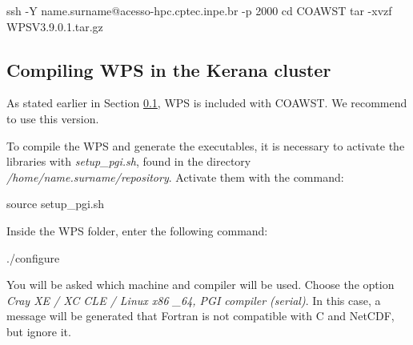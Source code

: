 \begin{bashcode}
ssh -Y name.surname@acesso-hpc.cptec.inpe.br -p 2000
cd COAWST
tar -xvzf WPSV3.9.0.1.tar.gz
\end{bashcode}
\bigskip

\subsection{Compiling WPS in the Kerana cluster}\label{wpsker}
\bigskip

\begin{tcolorbox}[enhanced,
    grow to left by=0cm,%
    grow to right by=0cm,%
    enlarge top by=0cm,%
    enlarge bottom by=0cm,%
    tcbox raise base,
    boxrule=1.0pt,
    left=18mm,
    colframe=red!50!black,coltext=red!25!black,colback=red!10!white,
    overlay={\begin{tcbclipinterior}\fill[red!75!blue!50!white] (frame.south west)
      rectangle node[text=white,font=\sffamily\bfseries\footnotesize,rotate=0] {WARNING} ([xshift=18mm]frame.north west);\end{tcbclipinterior}}]
      As stated earlier in Section \textcolor{bleu_cite}{\ref{wpsker}}, WPS is included with COAWST. We recommend to use this version.
\end{tcolorbox}
\bigskip

\noindent To compile the WPS and generate the executables, it is necessary to activate the libraries with \textit{setup\_pgi.sh},
found in the directory \textit{/home/name.surname/repository}. Activate them with the command:
\bigskip

\begin{bashcode}
source setup_pgi.sh
\end{bashcode}
\bigskip

\noindent Inside the WPS folder, enter the following command:
\bigskip

\begin{bashcode}
./configure
\end{bashcode}
\bigskip

\noindent You will be asked which machine and compiler will be used. Choose the option 
\textit{Cray XE / XC CLE / Linux x86 \_64, PGI compiler (serial)}. In this case, a message will be generated that Fortran is not compatible 
with C and NetCDF, but ignore it.
\bigskip

